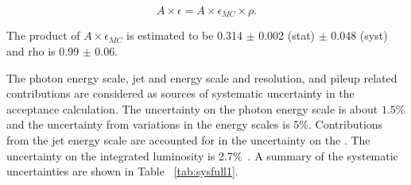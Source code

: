\begin{equation}
 A\times\epsilon = A\times\epsilon_{MC} \times \rho  .
\end{equation}

The product of $A\times\epsilon_{MC}$ is estimated to be
 0.314 $\pm$ 0.002 (stat) $\pm$ 0.048 (syst) and rho is 0.99 $\pm$ 0.06.


The photon energy scale, jet and \met energy scale and resolution,
 and pileup related contributions are considered as
 sources of systematic uncertainty in the acceptance calculation.
The uncertainty on the photon energy scale is about $1.5\%$
 and the uncertainty from variations in the \met energy scales is 5\%.
Contributions from the jet energy scale are accounted for in the  uncertainty on  
the \met. 
The uncertainty on the integrated luminosity is 2.7$\%$~\cite{LUM-13-001}.
A summary of the systematic uncertainties are shown in Table ~\ref{tab:sysfull1}.

\begin{table}[htbp]
\centering
{\scriptsize
{}
\caption{Summary of systematic unceratinties for signal and different background sources.}
\label{tab:sysfull1}}
\end{table}

